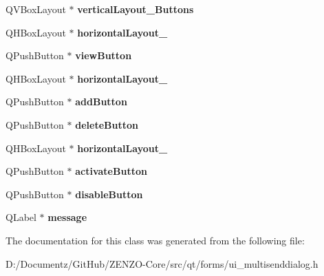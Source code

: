 \begin{DoxyCompactItemize}
Q\+V\+Box\+Layout $\ast$ {\bfseries vertical\+Layout\+\_\+\+Buttons}
\item 
\mbox{\label{class_ui___multi_send_dialog_a2fab070c6e6c1795596d66dc3a75478e}} 
Q\+H\+Box\+Layout $\ast$ {\bfseries horizontal\+Layout\+\_}
\item 
\mbox{\label{class_ui___multi_send_dialog_a8e70cd9ee8be4e6d7c9af1c7a82a5190}} 
Q\+Push\+Button $\ast$ {\bfseries view\+Button}
\item 
\mbox{\label{class_ui___multi_send_dialog_a0bcde95722a2e08dd87e18332af72331}} 
Q\+H\+Box\+Layout $\ast$ {\bfseries horizontal\+Layout\+\_}
\item 
\mbox{\label{class_ui___multi_send_dialog_aa54c98f40176d31e69022acb44135dfa}} 
Q\+Push\+Button $\ast$ {\bfseries add\+Button}
\item 
\mbox{\label{class_ui___multi_send_dialog_ad11f854a85311d973f363f59db03f04a}} 
Q\+Push\+Button $\ast$ {\bfseries delete\+Button}
\item 
\mbox{\label{class_ui___multi_send_dialog_aa2ab7c36548671f87f0bd18269749f1d}} 
Q\+H\+Box\+Layout $\ast$ {\bfseries horizontal\+Layout\+\_}
\item 
\mbox{\label{class_ui___multi_send_dialog_a3a59a775944f598ab2607b314e634886}} 
Q\+Push\+Button $\ast$ {\bfseries activate\+Button}
\item 
\mbox{\label{class_ui___multi_send_dialog_afea8cd2c107ac0a9d1a7a11dd2edc8f5}} 
Q\+Push\+Button $\ast$ {\bfseries disable\+Button}
\item 
\mbox{\label{class_ui___multi_send_dialog_a392276f4ed48c3f83ebc64c9ccc1d673}} 
Q\+Label $\ast$ {\bfseries message}
\end{DoxyCompactItemize}


The documentation for this class was generated from the following file\+:\begin{DoxyCompactItemize}
\item 
D\+:/\+Documentz/\+Git\+Hub/\+Z\+E\+N\+Z\+O-\/\+Core/src/qt/forms/ui\+\_\+multisenddialog.\+h\end{DoxyCompactItemize}
